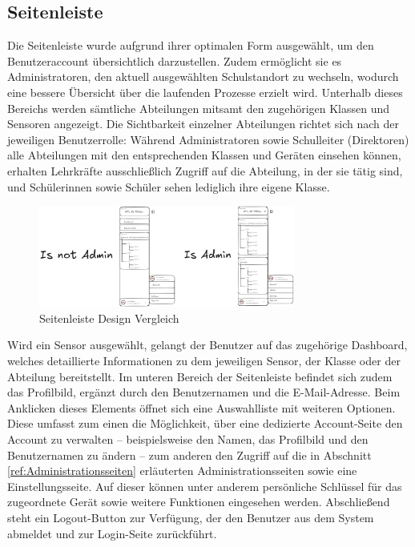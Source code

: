 \begin{inhalt}
\newpage

\subsection{Seitenleiste}

Die Seitenleiste \cite{ShadCNSidebar} wurde aufgrund ihrer optimalen Form ausgewählt, um den Benutzeraccount übersichtlich darzustellen. Zudem ermöglicht sie es Administratoren, den aktuell ausgewählten Schulstandort zu wechseln, wodurch eine bessere Übersicht über die laufenden Prozesse erzielt wird. Unterhalb dieses Bereichs werden sämtliche Abteilungen mitsamt den zugehörigen Klassen und Sensoren angezeigt. Die Sichtbarkeit einzelner Abteilungen richtet sich nach der jeweiligen Benutzerrolle: Während Administratoren sowie Schulleiter (Direktoren) alle Abteilungen mit den entsprechenden Klassen und Geräten einsehen können, erhalten Lehrkräfte ausschließlich Zugriff auf die Abteilung, in der sie tätig sind, und Schülerinnen sowie Schüler sehen lediglich ihre eigene Klasse.



\begin{figure}[!htb] 
\centering 
\includegraphics[width=0.75\textwidth]{files/Thomas/pics/Design-Grundlagen/Frontend/Sidebar/sidebar-adminvsnotadmin.png} 
\caption[Bildbezeichnung für Abbildungsverzeichnis]{Seitenleiste Design Vergleich} 
\label{fig:gehaeuse_internet_bild} 
\end{figure}


Wird ein Sensor ausgewählt, gelangt der Benutzer auf das zugehörige Dashboard, welches detaillierte Informationen zu dem jeweiligen Sensor, der Klasse oder der Abteilung bereitstellt. Im unteren Bereich der Seitenleiste befindet sich zudem das Profilbild, ergänzt durch den Benutzernamen und die E-Mail-Adresse. Beim Anklicken dieses Elements öffnet sich eine Auswahlliste mit weiteren Optionen. Diese umfasst zum einen die Möglichkeit, über eine dedizierte Account-Seite den Account zu verwalten – beispielsweise den Namen, das Profilbild und den Benutzernamen zu ändern – zum anderen den Zugriff auf die in Abschnitt \ref{ref:Administrationsseiten} erläuterten Administrationsseiten sowie eine Einstellungsseite. Auf dieser können unter anderem persönliche Schlüssel für das zugeordnete Gerät sowie weitere Funktionen eingesehen werden. Abschließend steht ein Logout-Button zur Verfügung, der den Benutzer aus dem System abmeldet und zur Login-Seite zurückführt.


\end{inhalt}
